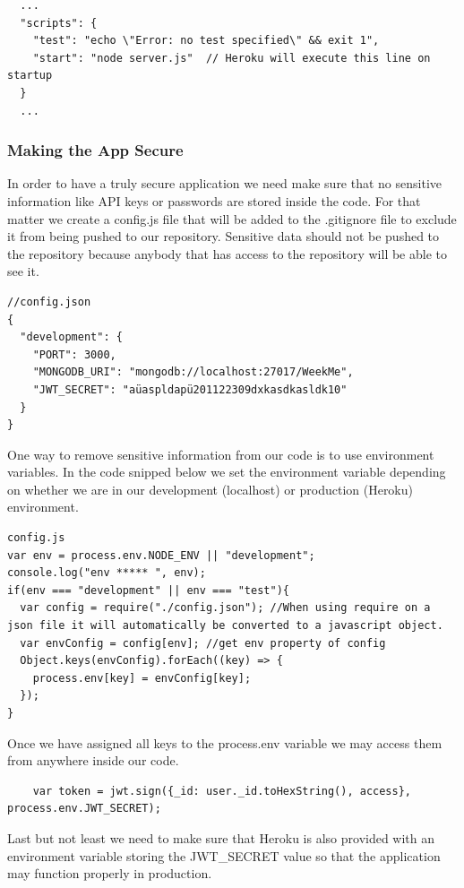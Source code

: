 \documentclass[11pt]{article}
\begin{document}
\begin{lstlisting}
  ...
  "scripts": {
    "test": "echo \"Error: no test specified\" && exit 1",
    "start": "node server.js"  // Heroku will execute this line on startup 
  } 
  ...
\end{lstlisting}


\subsubsection{Making the App Secure}
In order to have a truly secure application we need make sure that no sensitive information like API keys or passwords are stored inside the code. For that matter we create a config.js file that will be added to the .gitignore file to exclude it from being pushed to our repository. Sensitive data should not be pushed to the repository because anybody that has access to the repository will be able to see it.   
 
\begin{lstlisting}
//config.json 
{
  "development": {
    "PORT": 3000, 
    "MONGODB_URI": "mongodb://localhost:27017/WeekMe",
    "JWT_SECRET": "aüaspldapü201122309dxkasdkasldk10"
  }
} 
\end{lstlisting}


One way to remove sensitive information from our code is to use environment variables. 
In the code snipped below we set the environment variable depending on whether we are in our development (localhost) or production (Heroku) environment. 

\begin{lstlisting}
config.js
var env = process.env.NODE_ENV || "development";  
console.log("env ***** ", env);
if(env === "development" || env === "test"){
  var config = require("./config.json"); //When using require on a json file it will automatically be converted to a javascript object.
  var envConfig = config[env]; //get env property of config
  Object.keys(envConfig).forEach((key) => {
    process.env[key] = envConfig[key];
  });
}
\end{lstlisting}
 
Once we have assigned all keys to the process.env variable we may access them from anywhere inside our code. 

\begin{lstlisting}
	var token = jwt.sign({_id: user._id.toHexString(), access}, process.env.JWT_SECRET);
\end{lstlisting}

Last but not least we need to make sure that Heroku is also provided with an environment variable storing the JWT\_SECRET value so that the application may function properly in production.  
\end{document}
